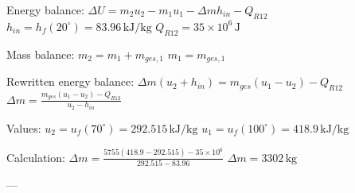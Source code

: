 Energy balance:  
\( \Delta U = m_2 u_2 - m_1 u_1 - \Delta m h_{in} - Q_{R12} \)  
\( h_{in} = h_f(20^\circ) = 83.96 \, \text{kJ/kg} \)  
\( Q_{R12} = 35 \times 10^6 \, \text{J} \)  

Mass balance:  
\( m_2 = m_1 + m_{ges,1} \)  
\( m_1 = m_{ges,1} \)  

Rewritten energy balance:  
\( \Delta m (u_2 + h_{in}) = m_{ges} (u_1 - u_2) - Q_{R12} \)  
\( \Delta m = \frac{m_{ges} (u_1 - u_2) - Q_{R12}}{u_2 - h_{in}} \)  

Values:  
\( u_2 = u_f(70^\circ) = 292.515 \, \text{kJ/kg} \)  
\( u_1 = u_f(100^\circ) = 418.9 \, \text{kJ/kg} \)  

Calculation:  
\( \Delta m = \frac{5755 (418.9 - 292.515) - 35 \times 10^6}{292.515 - 83.96} \)  
\( \Delta m = 3302 \, \text{kg} \)  

---